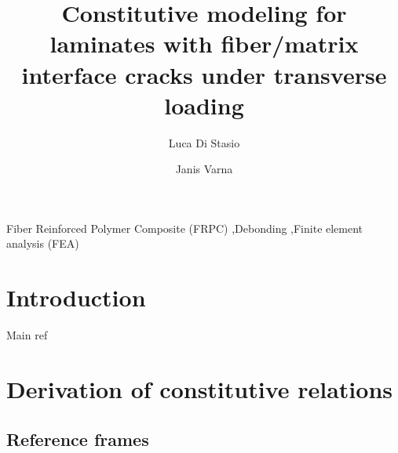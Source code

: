 \documentclass[review]{elsarticle}
\begin{document}
\begin{frontmatter}

\title{Constitutive modeling for laminates with fiber/matrix interface cracks under transverse loading}


\author[lulea]{Luca Di Stasio}
\author[lulea]{Janis Varna}


\address[lulea]{Lule\aa\ University of Technology, University Campus, SE-97187 Lule\aa, Sweden}


\begin{abstract}

\end{abstract}

\begin{keyword}
Fiber Reinforced Polymer Composite (FRPC) \sep Debonding \sep Finite element analysis (FEA)
\end{keyword}

\end{frontmatter}

\linenumbers

\section{Introduction}

Main ref~\cite{Lundmark2003,Lundmark2006,Varna2012,Loukil2012,Loukil2013a,Loukil2013b,Varna2016,Pupurs2016,Varna2018,Loukil2019a,Loukil2019b}

\section{Derivation of constitutive relations}

\subsection{Reference frames}
\end{document}
